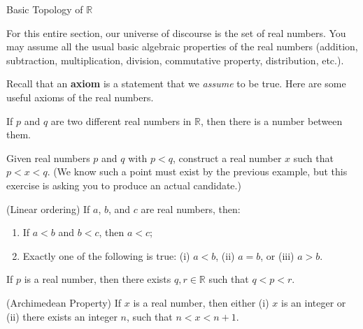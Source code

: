 \begin{section}{Basic Topology of $\mathbb{R}$}


\begin{remark}
For this entire section, our universe of discourse is the set of real numbers.  You may assume all the usual basic algebraic properties of the real numbers (addition, subtraction, multiplication, division, commutative property, distribution, etc.).
\end{remark}

Recall that an \textbf{axiom} is a statement that we \emph{assume} to be true.  Here are some useful axioms of the real numbers.

\begin{axiom} 
If $p$ and $q$ are two different real numbers in $\mathbb{R}$, then there is a number between them.
\end{axiom}

\begin{exercise}
Given real numbers $p$ and $q$ with $p<q$, construct a real number $x$ such that $p<x<q$.  (We know such a point must exist by the previous example, but this exercise is asking you to produce an actual candidate.)
\end{exercise}

\begin{axiom}
(Linear ordering) If $a$, $b$, and $c$ are real numbers, then:
\begin{enumerate}
\item If $a < b$ and $b<c$, then $a<c$;
\item Exactly one of the following is true: (i) $a < b$, (ii) $a=b$, or (iii) $a>b$.
\end{enumerate}
\end{axiom}

\begin{axiom}
If $p$ is a real number, then there exists $q,r\in\mathbb{R}$ such that $q<p<r$.
\end{axiom}

\begin{axiom}
(Archimedean Property) If $x$ is a real number, then either (i) $x$ is an integer or (ii) there exists an integer $n$, such that $n<x<n+1$. 
\end{axiom}


\end{section}
